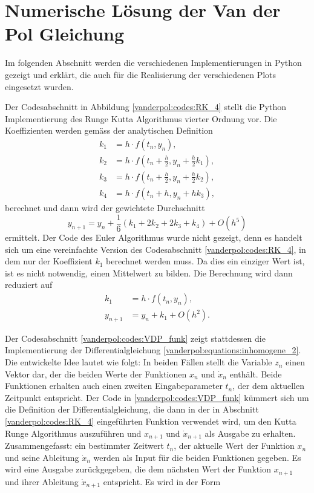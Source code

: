 %
%
%
\section{Numerische Lösung der Van der Pol Gleichung
\label{vanderpol:section:loesung}}
Im folgenden Abschnitt werden die verschiedenen Implementierungen in Python gezeigt und erklärt, die auch für die Realisierung der verschiedenen Plots eingesetzt wurden.

Der Codesabschnitt in Abbildung \ref{vanderpol:codes:RK_4} stellt die Python Implementierung des Runge Kutta Algorithmus vierter Ordnung vor. Die Koeffizienten werden gemäss der analytischen Definition
\begin{align*}
k_1 &= h \cdot f(t_n, y_n),\\
k_2 &= h \cdot f\left(t_n + \frac{h}{2}, y_n + \frac{h}{2} k_1\right), \\
k_3 &= h \cdot f\left(t_n + \frac{h}{2}, y_n + \frac{h}{2} k_2\right), \\
k_4 &= h \cdot f(t_n + h, y_n + h k_3),
\end{align*}
berechnet und dann wird der gewichtete Durchschnitt
\begin{equation}
y_{n+1} = y_n + \frac{1}{6}(k_1 + 2k_2 + 2k_3 + k_4) +O(h^5)
\end{equation}
ermittelt. Der Code des Euler Algorithmus wurde nicht gezeigt, denn es handelt sich um eine vereinfachte Version des Codesabschnitt \ref{vanderpol:codes:RK_4}, in dem nur der Koeffizient $k_1$ berechnet werden muss. Da dies ein einziger Wert ist, ist es nicht notwendig, einen Mittelwert zu bilden. Die Berechnung wird dann reduziert auf
\begin{align*}
k_1 &= h \cdot f(t_n, y_n), \\
y_{n+1} &= y_n + k_1 +O(h^2).
\end{align*}

Der Codesabschnitt \ref{vanderpol:codes:VDP_funk} zeigt stattdessen die Implementierung der Differentialgleichung \eqref{vanderpol:equations:inhomogene_2}. Die entwickelte Idee lautet wie folgt: In beiden Fällen stellt die Variable $z_n$ einen Vektor dar, der die beiden Werte der Funktionen $x_n$ und $\dot{x}_n$ enthält. Beide Funktionen erhalten auch einen zweiten Eingabeparameter $t_n$, der dem aktuellen Zeitpunkt entspricht. Der Code in \ref{vanderpol:codes:VDP_funk} kümmert sich um die Definition der Differentialgleichung, die dann in der in Abschnitt \ref{vanderpol:codes:RK_4} eingeführten Funktion verwendet wird, um den Kutta Runge Algorithmus auszuführen und $x_{n+1}$ und $\dot{x}_{n+1}$ als Ausgabe zu erhalten. Zusammengefasst: ein bestimmter Zeitwert $t_n$, der aktuelle Wert der Funktion $x_{n}$ und seine Ableitung $\dot{x}_{n}$ werden als Input für die beiden Funktionen gegeben. Es wird eine Ausgabe zurückgegeben, die dem nächsten Wert der Funktion $x_{n+1}$ und ihrer Ableitung $\dot{x}_{n+1}$ entspricht. Es wird in der Form
